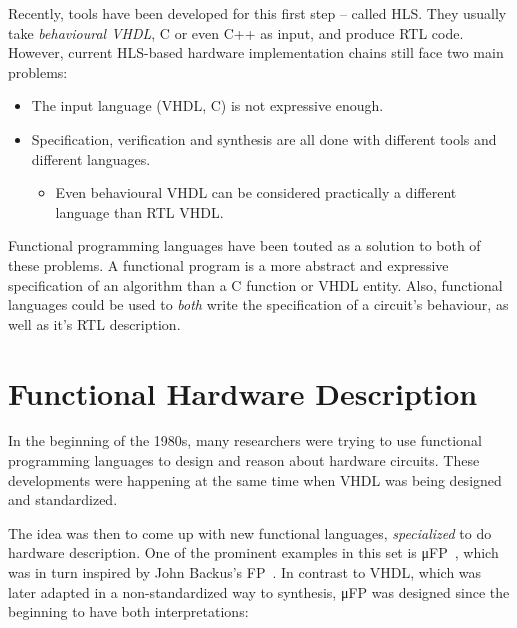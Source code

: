         Recently, tools have been developed for this first step -- called \ac{HLS}.
        They usually take \emph{behavioural \acs{VHDL}}, C or even C++ as input, and produce \ac{RTL} code.
        However, current \acs{HLS}-based hardware implementation chains still face two main problems:

        \begin{itemize}
            \item The input language (VHDL, C) is not expressive enough.
            \item Specification, verification and synthesis are all done with different tools and different languages.
            \begin{itemize}
                \item Even behavioural \acs{VHDL} can be considered practically a different language
                    than \acl{RTL} \acs{VHDL}.
            \end{itemize}
        \end{itemize}

        Functional programming languages have been touted as a solution to both of these problems.
        A functional program is a more abstract and expressive specification of an algorithm than
        a C function or VHDL entity.
        Also, functional languages could be used to \emph{both} write the specification of a circuit's behaviour,
        as well as it's \acl{RTL} description.


    \section{Functional Hardware Description}
    \label{sec:functional-hardware}
        In the beginning of the 1980s, many researchers were trying to use functional programming languages
        to design and reason about hardware circuits.
        These developments were happening at the same time when \ac{VHDL} was being designed and standardized.

        The idea was then to come up with new functional languages, \emph{specialized} to do hardware description.
        One of the prominent examples in this set is μFP~\cite{mufp-1984},
        which was in turn inspired by John Backus's FP~\cite{backus-turing-lecture}.
        In contrast to \ac{VHDL}, which was later adapted in a non-standardized way to synthesis,
        μFP was designed since the beginning to have both interpretations:

